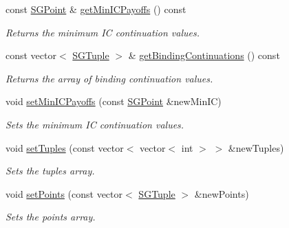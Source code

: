 \begin{DoxyCompactItemize}
const \hyperlink{classSGPoint}{S\+G\+Point} \& \hyperlink{classSGBaseAction_a860147b2ecb19aab60194ac0fe5f75db}{get\+Min\+I\+C\+Payoffs} () const
\begin{DoxyCompactList}\small\item\em Returns the minimum IC continuation values. \end{DoxyCompactList}\item 
\mbox{\label{classSGBaseAction_a7b2874bed40408753e336084b13914aa}} 
const vector$<$ \hyperlink{classSGTuple}{S\+G\+Tuple} $>$ \& \hyperlink{classSGBaseAction_a7b2874bed40408753e336084b13914aa}{get\+Binding\+Continuations} () const
\begin{DoxyCompactList}\small\item\em Returns the array of binding continuation values. \end{DoxyCompactList}\item 
\mbox{\label{classSGBaseAction_aef9a88a93c5adcd164f0c30e3b006ae1}} 
void \hyperlink{classSGBaseAction_aef9a88a93c5adcd164f0c30e3b006ae1}{set\+Min\+I\+C\+Payoffs} (const \hyperlink{classSGPoint}{S\+G\+Point} \&new\+Min\+IC)
\begin{DoxyCompactList}\small\item\em Sets the minimum IC continuation values. \end{DoxyCompactList}\item 
\mbox{\label{classSGBaseAction_a06ba7b17e5c67aeeadb18c4767e319b3}} 
void \hyperlink{classSGBaseAction_a06ba7b17e5c67aeeadb18c4767e319b3}{set\+Tuples} (const vector$<$ vector$<$ int $>$ $>$ \&new\+Tuples)
\begin{DoxyCompactList}\small\item\em Sets the tuples array. \end{DoxyCompactList}\item 
\mbox{\label{classSGBaseAction_ae14aaa4093d68f14b8af1b3769ca084a}} 
void \hyperlink{classSGBaseAction_ae14aaa4093d68f14b8af1b3769ca084a}{set\+Points} (const vector$<$ \hyperlink{classSGTuple}{S\+G\+Tuple} $>$ \&new\+Points)
\begin{DoxyCompactList}\small\item\em Sets the points array. \end{DoxyCompactList}\item 
\mbox{\label{classSGBaseAction_a991a8308a219ca7fadce3dcd5ae4ca71}} 

\end{DoxyCompactItemize}
